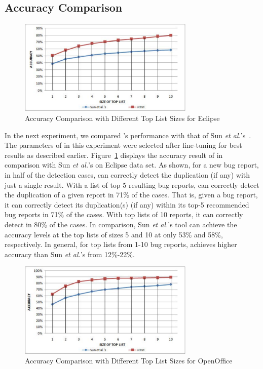 \subsection{Accuracy Comparison}

\begin{figure}[t]
\centering
\includegraphics[width=3.3in]{eclipse3}
\caption{Accuracy Comparison with Different Top List Sizes for Eclipse}
\label{eclipse}
\end{figure}


In the next experiment, we compared {\model}'s performance with that
of Sun {\em et al.}'s~\cite{davidlo10}. The parameters of {\model} in
this experiment were selected after fine-tuning for best results as
described earlier. Figure~\ref{eclipse} displays the accuracy result
of {\model} in comparison with Sun {\em et al.}'s on Eclipse data
set. As shown, for a new bug report, in half of the detection cases,
{\model} can correctly detect the duplication (if any) with just a
single result. With a list of top 5 resulting bug reports, {\model}
can correctly detect the duplication of a given report in 71\% of the
cases. That is, given a bug report, it can correctly detect its
duplication(s) (if any) within its top-5 recommended bug reports in
71\% of the cases. With top lists of 10 reports, it can correctly
detect in 80\% of the cases. In comparison, Sun {\em et al.}'s tool
can achieve the accuracy levels at the top lists of sizes 5 and 10 at
only 53\% and 58\%, respectively. In general, for top lists from 1-10
bug reports, {\model} achieves higher accuracy than Sun {\em et al.}'s
from 12\%-22\%.

\begin{figure}[t]
\centering
\includegraphics[width=3.3in]{openoffice}
\caption{Accuracy Comparison with Different Top List Sizes for OpenOffice}
\label{openoffice}
\end{figure}

